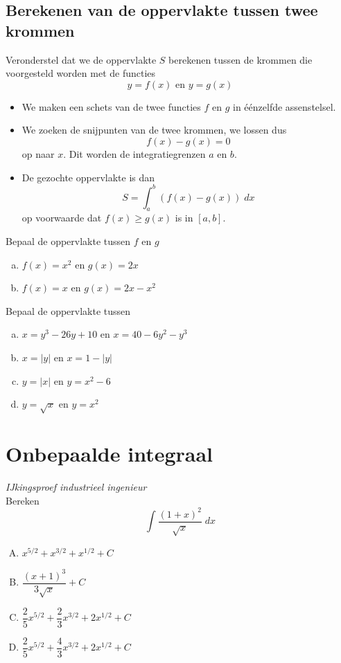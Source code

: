 \documentclass[a4paper,12pt, twoside]{article}
\begin{document}
\subsection{Berekenen van de oppervlakte tussen twee krommen}

Veronderstel dat we de oppervlakte $S$ berekenen tussen de krommen die voorgesteld worden met de functies
$$y=f(x) \text{ en } y=g(x)$$
\begin{itemize}
\item We maken een schets van de twee functies $f$ en $g$ in éénzelfde assenstelsel.
\item We zoeken de snijpunten van de twee krommen, we lossen dus
  $$f(x)-g(x)=0$$
  op naar $x$. Dit worden de integratiegrenzen $a$ en $b$.
\item De gezochte oppervlakte is dan
  $$S = \int_a^b (f(x)-g(x))\; dx$$
  op voorwaarde dat $f(x) \geq g(x)$ is in $[a,b]$.
\end{itemize}


\begin{oefening}
Bepaal de oppervlakte tussen $f$ en $g$
\begin{enumerate}[(a)]
\itemsep1em
  \item $f(x)=x^2$ en $g(x)=2x$
  \item $f(x)=x$ en $g(x)=2x-x^2$
\end{enumerate}
\end{oefening}

\begin{oefening}
Bepaal de oppervlakte tussen
\begin{enumerate}[(a)]
\itemsep1em
  \item $x=y^3-26y+10$ en $x=40-6y^2-y^3$
  \item $x=|y|$ en $x=1-|y|$
  \item $y=|x|$ en $y=x^2-6$
  \item $y=\sqrt{x}$ en $y=x^2$
\end{enumerate}
\end{oefening}

\cleardoublepage
\section{Onbepaalde integraal}

\begin{oefening} {\scriptsize \em IJkingsproef industrieel ingenieur}\\
Bereken
$$\int \dfrac{(1+x)^2}{\sqrt{x}}\;dx$$
\begin{enumerate}[(A)]
\itemsep.5em
  \item $x^{5/2}+x^{3/2}+x^{1/2} + C$
  \item $\dfrac{(x+1)^3}{3\sqrt{x}} + C$
  \item $\dfrac{2}{5}x^{5/2}+\dfrac{2}{3}x^{3/2}+2x^{1/2} + C$
  \item $\dfrac{2}{5}x^{5/2}+\dfrac{4}{3}x^{3/2}+2x^{1/2} + C$
\end{enumerate}
\end{oefening}
\end{document}

